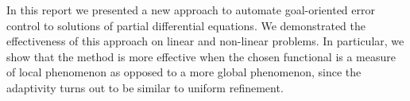 In this report we presented a new approach to automate goal-oriented error
control to solutions of partial differential equations. We demonstrated the
effectiveness of this approach on linear and non-linear problems. In particular,
we show that the method is more effective when the chosen functional is a
measure of local phenomenon as opposed to a more global phenomenon, since the
adaptivity turns out to be similar to uniform refinement.

